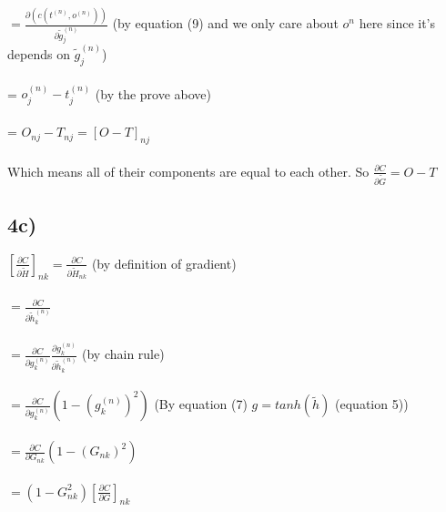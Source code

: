 \documentclass{article}  %
\begin{document}
		 $=\frac{\partial(c(t^{(n)},o^{(n)}))}{\partial\tilde{g}^{(n)}_{j}}$ (by equation (9) and we only care about $o^n$ here since it's depends on $\tilde{g}^{(n)}_{j}$)\\\\
		 = $  o_{j}^{(n)}-t_{j}^{(n)}$ (by the prove above)\\\\
		 = $ O_{nj} - T_{nj} = [O-T]_{nj}$\\\\
		 Which means all of their components are equal to each other. So
		  $\frac{\partial C}{\partial \tilde{G}} = O-T$
		  
		 \subsection{4c)}
		 $[\frac{\partial C}{\partial \tilde{H}}]_{nk} = 
		 \frac{\partial C}{\partial \tilde{H}_{nk}}$ (by definition of gradient)\\\\
		 $ = \frac{\partial C}{\partial \tilde{h}^{(n)}_{k}} $  \\\\
		 $ = \frac{\partial C}{\partial g^{(n)}_{k}} \frac{\partial g_{k}^{(n)}}{\partial \tilde{h}_{k}^{(n)}}$ (by chain rule)\\\\
		 $=\frac{\partial C}{\partial g^{(n)}_{k}} (1 - (g^{(n)}_{k})^2)$ (By equation (7) $g = tanh(\tilde{h})$ (equation 5))\\\\
		 $ = \frac{\partial C}{\partial G_{nk}} (1 - (G_{nk})^2)$\\\\
		 $= (1-G^2_{nk})[\frac{\partial C}{\partial G}]_{nk}
$
\end{document}
